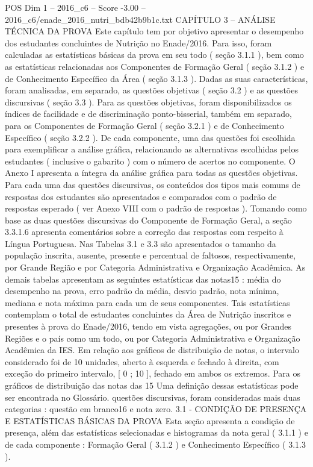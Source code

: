 \begin{textsample}{POS Dim 1 – 2016\_c6 – Score -3.00 – 2016\_c6/enade\_2016\_nutri\_bdb42b9b1c.txt}  \label{ex:f1_pos_392}
CAPÍTULO 3 – ANÁLISE TÉCNICA DA PROVA Este capítulo tem por objetivo apresentar o desempenho dos estudantes concluintes de Nutrição no Enade/2016.
Para isso, foram calculadas as estatísticas básicas da prova em seu todo ( seção 3.1.1 ), bem como as estatísticas relacionadas aos Componentes de Formação Geral ( seção 3.1.2 ) e de Conhecimento Específico da Área ( seção 3.1.3 ).
Dadas as suas características, foram analisadas, em separado, as questões objetivas ( seção 3.2 ) e as questões discursivas ( seção 3.3 ).
Para as questões objetivas, foram disponibilizados os índices de facilidade e de discriminação ponto-bisserial, também em separado, para os Componentes de Formação Geral ( seção 3.2.1 ) e de Conhecimento Específico ( seção 3.2.2 ).
De cada componente, uma das questões foi escolhida para exemplificar a análise gráfica, relacionando as alternativas escolhidas pelos estudantes ( inclusive o gabarito ) com o número de acertos no componente.
O Anexo I apresenta a íntegra da análise gráfica para todas as questões objetivas.
Para cada uma das questões discursivas, os conteúdos dos tipos mais comuns de respostas dos estudantes são apresentados e comparados com o padrão de respostas esperado ( ver Anexo VIII com o padrão de respostas ).
Tomando como base as duas questões discursivas do Componente de Formação Geral, a seção 3.3.1.6 apresenta comentários sobre a correção das respostas com respeito à Língua Portuguesa.
Nas Tabelas 3.1 e 3.3 são apresentados o tamanho da população inscrita, ausente, presente e percentual de faltosos, respectivamente, por Grande Região e por Categoria Administrativa e Organização Acadêmica.
As demais tabelas apresentam as seguintes estatísticas das notas15 : média do desempenho na prova, erro padrão da média, desvio padrão, nota mínima, mediana e nota máxima para cada um de seus componentes.
Tais estatísticas contemplam o total de estudantes concluintes da Área de Nutrição inscritos e presentes à prova do Enade/2016, tendo em vista agregações, ou por Grandes Regiões e o país como um todo, ou por Categoria Administrativa e Organização Acadêmica da IES.
Em relação aos gráficos de distribuição de notas, o intervalo considerado foi de 10 unidades, aberto à esquerda e fechado à direita, com exceção do primeiro intervalo, [ 0 ; 10 ], fechado em ambos os extremos.
Para os gráficos de distribuição das notas das 15 Uma definição dessas estatísticas pode ser encontrada no Glossário. questões discursivas, foram consideradas mais duas categorias : questão em branco16 e nota zero. 3.1 - CONDIÇÃO DE PRESENÇA E ESTATÍSTICAS BÁSICAS DA PROVA Esta seção apresenta a condição de presença, além das estatísticas selecionadas e histogramas da nota geral ( 3.1.1 ) e de cada componente : Formação Geral ( 3.1.2 ) e Conhecimento Específico ( 3.1.3 ).

\end{textsample}
